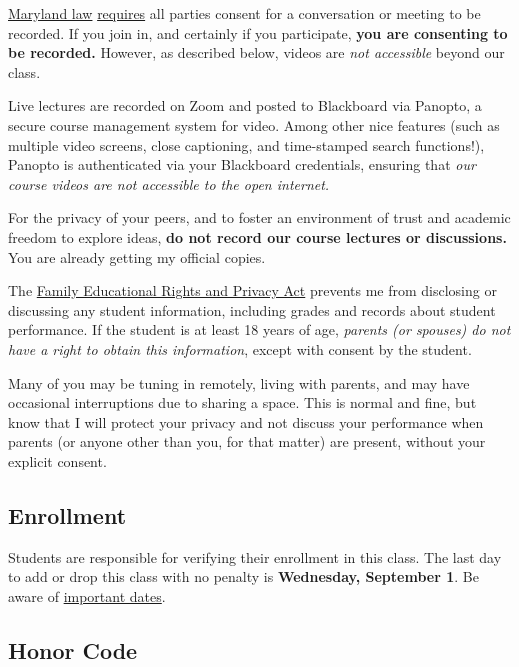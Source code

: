 \documentclass{article}
\begin{document}
\href{https://www.execvision.io/blog/maryland-call-recording-laws/}{Maryland
law}
\href{https://law.justia.com/codes/maryland/2005/gcj/10-402.html}{requires}
all parties consent for a conversation or meeting to be recorded. If you
join in, and certainly if you participate, \textbf{you are consenting to
be recorded.} However, as described below, videos are \emph{not
accessible} beyond our class.

Live lectures are recorded on Zoom and posted to Blackboard via Panopto,
a secure course management system for video. Among other nice features
(such as multiple video screens, close captioning, and time-stamped
search functions!), Panopto is authenticated via your Blackboard
credentials, ensuring that \emph{our course videos are not accessible to
the open internet.}

For the privacy of your peers, and to foster an environment of trust and
academic freedom to explore ideas, \textbf{do not record our course
lectures or discussions.} You are already getting my official copies.

The
\href{https://www2.ed.gov/policy/gen/guid/fpco/ferpa/index.html}{Family
Educational Rights and Privacy Act} prevents me from disclosing or
discussing any student information, including grades and records about
student performance. If the student is at least 18 years of age,
\emph{parents (or spouses) do not have a right to obtain this
information}, except with consent by the student.

Many of you may be tuning in remotely, living with parents, and may have
occasional interruptions due to sharing a space. This is normal and
fine, but know that I will protect your privacy and not discuss your
performance when parents (or anyone other than you, for that matter) are
present, without your explicit consent.

\hypertarget{enrollment}{%
\subsection{Enrollment}\label{enrollment}}

Students are responsible for verifying their enrollment in this class.
The last day to add or drop this class with no penalty is
\textbf{Wednesday, September 1}. Be aware of
\href{https://www.hood.edu/offices-services/registrars-office/academic-calendar}{important
dates}.

\hypertarget{honor-code}{%
\subsection{Honor Code}\label{honor-code}}
\end{document}
